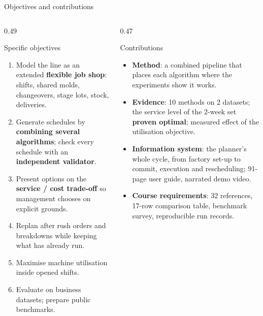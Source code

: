 \begin{frame}{Objectives and contributions}
\begin{columns}[T]
\begin{column}{0.49\textwidth}
\begin{block}{Specific objectives}
\scriptsize
\begin{enumerate}\setlength{\itemsep}{0.2em}
  \item Model the line as an extended \textbf{flexible job shop}: shifts, shared molds, changeovers, stage lots, stock, deliveries.
  \item Generate schedules by \textbf{combining several algorithms}; check every schedule with an \textbf{independent validator}.
  \item Present options on the \textbf{service / cost trade-off} so management chooses on explicit grounds.
  \item Replan after rush orders and breakdowns while keeping what has already run.
  \item Maximise machine utilisation inside opened shifts.
  \item Evaluate on business datasets; prepare public benchmarks.
\end{enumerate}
\end{block}
\end{column}
\begin{column}{0.47\textwidth}
\begin{exampleblock}{Contributions}
\scriptsize
\begin{itemize}\setlength{\itemsep}{0.3em}
  \item \textbf{Method}: a combined pipeline that places each algorithm where the experiments show it works.
  \item \textbf{Evidence}: 10 methods on 2 datasets; the service level of the 2-week set \textbf{proven optimal};
        measured effect of the utilisation objective.
  \item \textbf{Information system}: the planner's whole cycle, from factory set-up to commit, execution and rescheduling;
        91-page user guide, narrated demo video.
  \item \textbf{Course requirements}: 32 references, 17-row comparison table, benchmark survey, reproducible run records.
\end{itemize}
\end{exampleblock}
\end{column}
\end{columns}
\end{frame}

